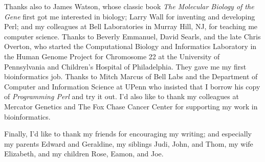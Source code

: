 Thanks also to James Watson, whose classic book \textit{The Molecular Biology of the Gene} first got me interested in biology; Larry Wall for inventing and developing Perl; and my colleagues at Bell Laboratories in Murray Hill, NJ, for teaching me computer science. Thanks to Beverly Emmanuel, David Searls, and the late Chris Overton, who started the Computational Biology and Informatics Laboratory in the Human Genome Project for Chromosome 22 at the University of Pennsylvania and Children's Hospital of Philadelphia. They gave me my first bioinformatics job. Thanks to Mitch Marcus of Bell Labs and the Department of Computer and Information Science at UPenn who insisted that I borrow his copy of \textit{Programming Perl} and try it out. I'd also like to thank my colleagues at Mercator Genetics and The Fox Chase Cancer Center for supporting my work in bioinformatics.

Finally, I'd like to thank my friends for encouraging my writing; and especially my parents Edward and Geraldine, my siblings Judi, John, and Thom, my wife Elizabeth, and my children Rose, Eamon, and Joe.
